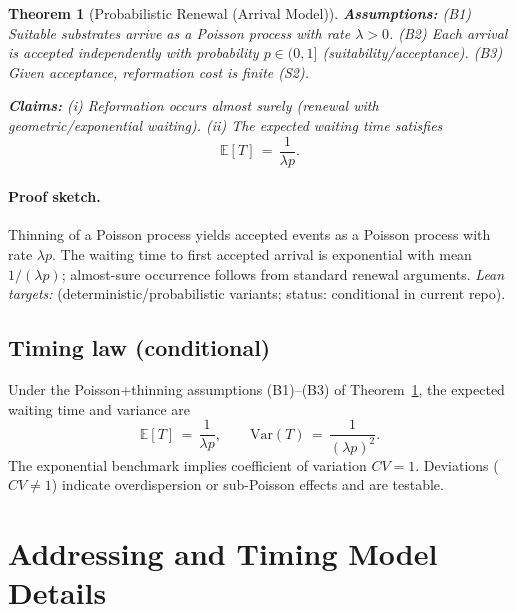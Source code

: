 \documentclass[11pt,letterpaper]{article}
\newcommand{\lean}[1]{\texttt{\detokenize{#1}}}
\newtheorem{theorem}{Theorem}[section]
\theoremstyle{definition}
\theoremstyle{remark}
\begin{document}
\begin{theorem}[Probabilistic Renewal (Arrival Model)]\label{thm:recurrence_prob}
\textbf{Assumptions:} (B1) Suitable substrates arrive as a Poisson process with rate \(\lambda>0\). (B2) Each arrival is accepted independently with probability \(p\in(0,1]\) (suitability/acceptance). (B3) Given acceptance, reformation cost is finite (S2).

\textbf{Claims:} (i) Reformation occurs almost surely (renewal with geometric/exponential waiting). (ii) The expected waiting time satisfies
\begin{equation}
  \mathbb{E}[T] \,=\, \frac{1}{\lambda p}. \label{eq:ET}
\end{equation}
\end{theorem}

\paragraph{Proof sketch.}
Thinning of a Poisson process yields accepted events as a Poisson process with rate \(\lambda p\). The waiting time to first accepted arrival is exponential with mean \(1/(\lambda p)\); almost-sure occurrence follows from standard renewal arguments. \emph{Lean targets:} \lean{eternal_recurrence} (deterministic/probabilistic variants; status: conditional in current repo).

\subsection{Timing law (conditional)}

Under the Poisson+thinning assumptions (B1)--(B3) of Theorem~\ref{thm:recurrence_prob}, the expected waiting time and variance are
\begin{equation}
  \mathbb{E}[T] \,=\, \frac{1}{\lambda p},\qquad \mathrm{Var}(T) \,=\, \frac{1}{(\lambda p)^2}. \label{eq:ETVar}
\end{equation}
The exponential benchmark implies coefficient of variation \(CV=1\). Deviations (\(CV\ne 1\)) indicate overdispersion or sub-Poisson effects and are testable.


\section{Addressing and Timing Model Details}
\end{document}
